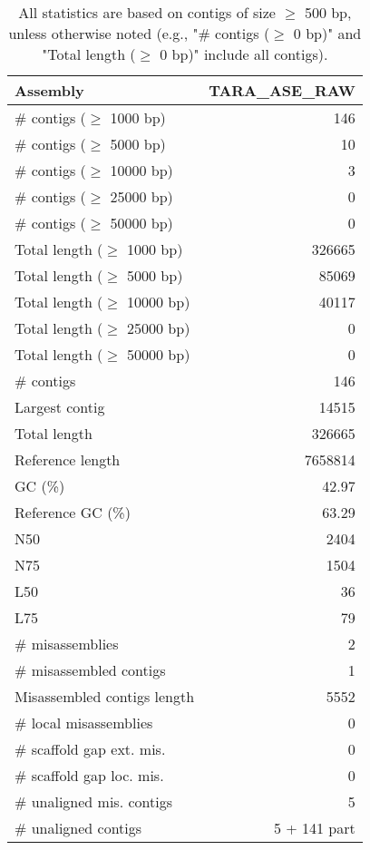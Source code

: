 \documentclass[12pt,a4paper]{article}
\begin{document}
\begin{table}[ht]
\begin{center}
\caption{All statistics are based on contigs of size $\geq$ 500 bp, unless otherwise noted (e.g., "\# contigs ($\geq$ 0 bp)" and "Total length ($\geq$ 0 bp)" include all contigs).}
\begin{tabular}{|l*{1}{|r}|}
\hline
Assembly & TARA\_ASE\_RAW \\ \hline
\# contigs ($\geq$ 1000 bp) & 146 \\ \hline
\# contigs ($\geq$ 5000 bp) & 10 \\ \hline
\# contigs ($\geq$ 10000 bp) & 3 \\ \hline
\# contigs ($\geq$ 25000 bp) & 0 \\ \hline
\# contigs ($\geq$ 50000 bp) & 0 \\ \hline
Total length ($\geq$ 1000 bp) & 326665 \\ \hline
Total length ($\geq$ 5000 bp) & 85069 \\ \hline
Total length ($\geq$ 10000 bp) & 40117 \\ \hline
Total length ($\geq$ 25000 bp) & 0 \\ \hline
Total length ($\geq$ 50000 bp) & 0 \\ \hline
\# contigs & 146 \\ \hline
Largest contig & 14515 \\ \hline
Total length & 326665 \\ \hline
Reference length & 7658814 \\ \hline
GC (\%) & 42.97 \\ \hline
Reference GC (\%) & 63.29 \\ \hline
N50 & 2404 \\ \hline
N75 & 1504 \\ \hline
L50 & 36 \\ \hline
L75 & 79 \\ \hline
\# misassemblies & 2 \\ \hline
\# misassembled contigs & 1 \\ \hline
Misassembled contigs length & 5552 \\ \hline
\# local misassemblies & 0 \\ \hline
\# scaffold gap ext. mis. & 0 \\ \hline
\# scaffold gap loc. mis. & 0 \\ \hline
\# unaligned mis. contigs & 5 \\ \hline
\# unaligned contigs & 5 + 141 part \\ \hline

\end{tabular}
\end{center}
\end{table}
\end{document}
